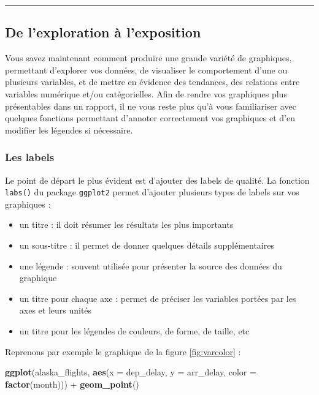 \documentclass[a4paperpaper,]{article}
\newenvironment{Shaded}{\begin{snugshade}}{\end{snugshade}}
\newcommand{\DataTypeTok}[1]{\textcolor[rgb]{0.00,0.34,0.68}{#1}}
\newcommand{\KeywordTok}[1]{\textcolor[rgb]{0.12,0.11,0.11}{\textbf{#1}}}
\newcommand{\NormalTok}[1]{\textcolor[rgb]{0.12,0.11,0.11}{#1}}
\newcommand{\OperatorTok}[1]{\textcolor[rgb]{0.12,0.11,0.11}{#1}}
\newcommand{\StringTok}[1]{\textcolor[rgb]{0.75,0.01,0.01}{#1}}
\providecommand{\tightlist}{%
  \setlength{\itemsep}{0pt}\setlength{\parskip}{0pt}}
\theoremstyle{definition}
\theoremstyle{definition}
\theoremstyle{definition}
\theoremstyle{remark}
\begin{document}
\begin{center}\rule{0.5\linewidth}{\linethickness}\end{center}

\hypertarget{de-lexploration-a-lexposition}{%
\subsection{De l'exploration à
l'exposition}\label{de-lexploration-a-lexposition}}

Vous savez maintenant comment produire une grande variété de graphiques,
permettant d'explorer vos données, de visualiser le comportement d'une
ou plusieurs variables, et de mettre en évidence des tendances, des
relations entre variables numérique et/ou catégorielles. Afin de rendre
vos graphiques plus présentables dans un rapport, il ne vous reste plus
qu'à vous familiariser avec quelques fonctions permettant d'annoter
correctement vos graphiques et d'en modifier les légendes si nécessaire.

\hypertarget{les-labels}{%
\subsubsection{Les labels}\label{les-labels}}

Le point de départ le plus évident est d'ajouter des labels de qualité.
La fonction \texttt{labs()} du package \texttt{ggplot2} permet d'ajouter
plusieurs types de labels sur vos graphiques :

\begin{itemize}
\tightlist
\item
  un titre : il doit résumer les résultats les plus importants
\item
  un sous-titre : il permet de donner quelques détails supplémentaires
\item
  une légende : souvent utilisée pour présenter la source des données du
  graphique
\item
  un titre pour chaque axe : permet de préciser les variables portées
  par les axes et leurs unités
\item
  un titre pour les légendes de couleurs, de forme, de taille, etc
\end{itemize}

Reprenons par exemple le graphique de la figure \ref{fig:varcolor} :

\begin{Shaded}
\begin{Highlighting}[]
\KeywordTok{ggplot}\NormalTok{(alaska_flights, }\KeywordTok{aes}\NormalTok{(}\DataTypeTok{x =}\NormalTok{ dep_delay, }\DataTypeTok{y =}\NormalTok{ arr_delay, }\DataTypeTok{color =} \KeywordTok{factor}\NormalTok{(month))) }\OperatorTok{+}
\StringTok{  }\KeywordTok{geom_point}\NormalTok{()}
\end{Highlighting}
\end{Shaded}
\end{document}
